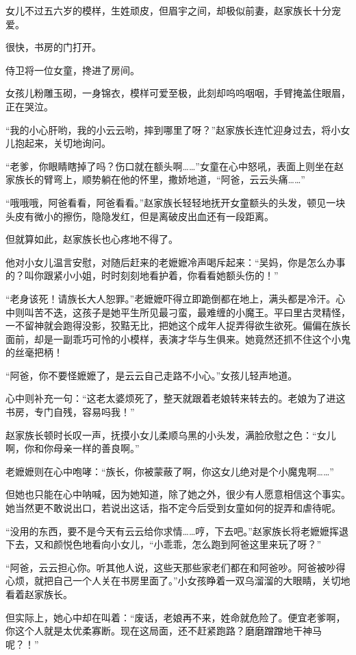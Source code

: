 \begin{this_body}
女儿不过五六岁的模样，生姓顽皮，但眉宇之间，却极似前妻，赵家族长十分宠爱。

很快，书房的门打开。

侍卫将一位女童，搀进了房间。

女孩儿粉雕玉砌，一身锦衣，模样可爱至极，此刻却呜呜咽咽，手臂掩盖住眼眉，正在哭泣。

“我的小心肝哟，我的小云云哟，摔到哪里了呀？”赵家族长连忙迎身过去，将小女儿抱起来，关切地询问。

“老爹，你眼睛瞎掉了吗？伤口就在额头啊……”女童在心中怒吼，表面上则坐在赵家族长的臂弯上，顺势躺在他的怀里，撒娇地道，“阿爸，云云头痛……”

“哦哦哦，阿爸看看，阿爸看看。”赵家族长轻轻地抚开女童额头的头发，顿见一块头皮有微小的擦伤，隐隐发红，但是离破皮出血还有一段距离。

但就算如此，赵家族长也心疼地不得了。

他对小女儿温言安慰，对随后赶来的老嬷嬷冷声喝斥起来：“吴妈，你是怎么办事的？叫你跟紧小小姐，时时刻刻地看护着，你看看她额头伤的！”

“老身该死！请族长大人恕罪。”老嬷嬷吓得立即跪倒都在地上，满头都是冷汗。心中则叫苦不迭，这孩子是她平生所见最刁蛮，最难缠的小魔王。平曰里古灵精怪，一不留神就会跑得没影，狡黠无比，把她这个成年人捉弄得欲生欲死。偏偏在族长面前，却是一副乖巧可怜的小模样，表演才华与生俱来。她竟然还抓不住这个小鬼的丝毫把柄！

“阿爸，你不要怪嬷嬷了，是云云自己走路不小心。”女孩儿轻声地道。

心中则补充一句：“这老太婆烦死了，整天就跟着老娘转来转去的。老娘为了进这书房，专门自残，容易吗我！”

赵家族长顿时长叹一声，抚摸小女儿柔顺乌黑的小头发，满脸欣慰之色：“女儿啊，你和你母亲一样的善良啊。”

老嬷嬷则在心中咆哮：“族长，你被蒙蔽了啊，你这女儿绝对是个小魔鬼啊……”

但她也只能在心中呐喊，因为她知道，除了她之外，很少有人愿意相信这个事实。她当然更不敢说出口，若说出这话，指不定今后受到女童如何的捉弄和虐待呢。

“没用的东西，要不是今天有云云给你求情……哼，下去吧。”赵家族长将老嬷嬷挥退下去，又和颜悦色地看向小女儿，“小乖乖，怎么跑到阿爸这里来玩了呀？”

“阿爸，云云担心你。听其他人说，这些天那些家老们都在和阿爸吵。阿爸被吵得心烦，就把自己一个人关在书房里面了。”小女孩睁着一双乌溜溜的大眼睛，关切地看着赵家族长。

但实际上，她心中却在叫着：“废话，老娘再不来，姓命就危险了。便宜老爹啊，你这个人就是太优柔寡断。现在这局面，还不赶紧跑路？磨磨蹭蹭地干神马呢？！”


\end{this_body}
